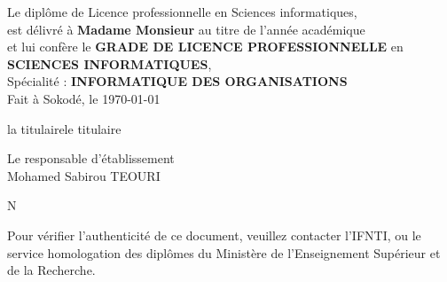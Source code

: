 \documentclass[a4paper, landscape, 10pt]{article}
\begin{document}
\noindent
Le diplôme de Licence professionnelle en Sciences informatiques,\\
est délivré à \textbf{Madame Monsieur  } au titre de l'année académique \\
et lui confère le \textbf{GRADE DE LICENCE PROFESSIONNELLE} en \textbf{SCIENCES INFORMATIQUES},\\
Spécialité : \textbf{INFORMATIQUE DES ORGANISATIONS}\\

Fait à Sokodé, le \today \\

\vspace{0.5cm}


\noindent
\begin{minipage}{0.49\textwidth}
	\begin{center}
		la titulairele titulaire\\
		\vspace{2cm}
		 
	\end{center}
\end{minipage}\hfill
\begin{minipage}{0.49\textwidth}
	\begin{center}
		Le responsable d'établissement\\
		\vspace{2cm}
		Mohamed Sabirou TEOURI
	\end{center}
\end{minipage}

\vspace{1.5cm}
\noindent
N\textdegree {}


\newpage


\vspace{-10cm}
\begin{center}
	Pour vérifier l’authenticité de ce document, veuillez contacter l’IFNTI,
	ou le service homologation des diplômes du Ministère de l’Enseignement Supérieur et de la Recherche.
\end{center}
\end{document}
